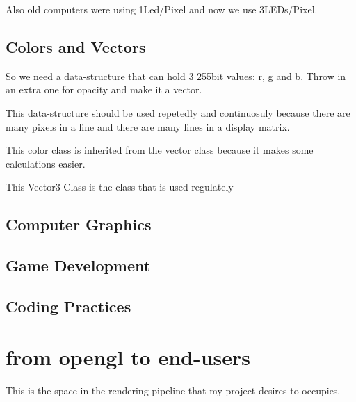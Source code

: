             Also old computers were using 1Led/Pixel and now we use 3LEDs/Pixel.
        \subsection{Colors and Vectors}
            So we need a data-structure that can hold 3 255bit values: r, g and b. Throw in an extra one for opacity and make it a vector.


            This data-structure should be used repetedly and continuosuly because there are many pixels in a line and there are many lines in a display matrix.

            This color class is inherited from the vector class because it makes some calculations easier.


            This Vector3 Class is the class that is used regulately

        \subsection{Computer Graphics}
        \subsection{Game Development}
        \subsection{Coding Practices}

    \section{from opengl to end-users}
        This is the space in the rendering pipeline that my project desires to occupies. 




